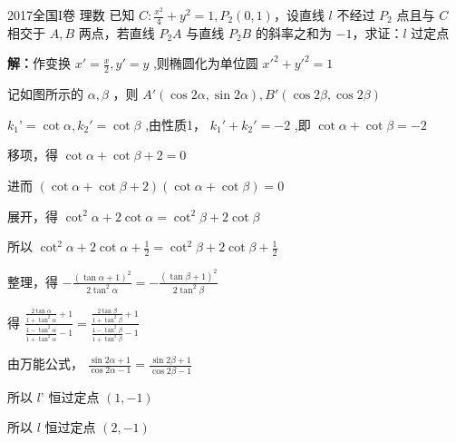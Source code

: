 \begin{example}{2017全国I卷 理数}
已知 \(C:\frac{x^2}4+y^2=1,P_2(0,1)\)，设直线 \(l\) 不经过 \(P_2\) 点且与 \(C\) 相交于 \(A,B\) 两点，若直线 \(P_2A\) 与直线 \(P_2B\) 的斜率之和为 \(-1\)，求证：\(l\) 过定点

\textbf{解：}作变换 \(x'=\frac{x}{2},y'=y\) ,则椭圆化为单位圆 \(x'^2+y'^2=1\)

记如图所示的 \(\alpha,\beta\) ，则 \(A'(\cos2\alpha,\sin2\alpha),B'(\cos2\beta,\cos2\beta)\)

\(k_1’=\cot{\alpha},k_2'=\cot{\beta}\) ,由性质1， \(k_1'+k_2'=-2\) ,即 \(\cot{\alpha}+\cot{\beta}=-2\)

移项，得 \(\cot\alpha+\cot \beta+2=0\)

进而 \((\cot\alpha+\cot \beta+2)(\cot \alpha+\cot\beta)=0\)

展开，得 \(\cot^2\alpha+2\cot\alpha=\cot^2\beta+2\cot\beta\)

所以 \(\cot^2\alpha+2\cot\alpha+\frac{1}{2}=\cot^2\beta+2\cot\beta+\frac{1}{2}\)

整理，得 \(-\frac{(\tan\alpha+1)^2}{2\tan^2\alpha}=-\frac{(\tan\beta+1)^2}{2\tan^2\beta}\)

得 \(\frac{\frac{2\tan\alpha}{1+\tan^2\alpha}+1}{\frac{1-\tan^2\alpha}{1+\tan^2\alpha}-1}=\frac{\frac{2\tan\beta}{1+\tan^2\beta}+1}{\frac{1-\tan^2\beta}{1+\tan^2\beta}-1}\)

由万能公式， \(\frac{\sin2\alpha+1}{\cos2\alpha-1}=\frac{\sin2\beta+1}{\cos2\beta-1}\)

所以 \(l’\) 恒过定点 \((1,-1)\)

所以 \(l\) 恒过定点 \((2,-1)\) 
\end{example}